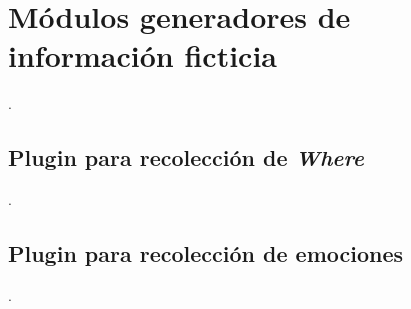 \section{Módulos generadores de información ficticia}

.


\subsection{Plugin para recolección de \textit{Where}}

.


\subsection{Plugin para recolección de emociones}

.



